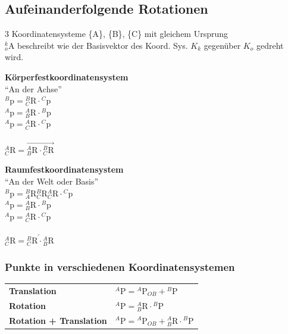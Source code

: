 \subsection{Aufeinanderfolgende Rotationen}
3 Koordinatensysteme \{A\}, \{B\}, \{C\} mit gleichem Ursprung\\
${}^k_o\mathrm{A}$ beschreibt wie der Basisvektor des Koord. Sys. $K_k$ gegenüber $K_o$ gedreht wird.\newline
\begin{minipage}{6cm}
    \textbf{Körperfestkoordinatensystem}\\
    "`An der Achse"'\\
    ${}^B\mathrm{p}={}^B_C\mathrm{R}\cdot{}^C\mathrm{p}$\\
    ${}^A\mathrm{p}={}^A_B\mathrm{R}\cdot{}^B\mathrm{p}$\\
    ${}^A\mathrm{p}={}^A_C\mathrm{R}\cdot{}^C\mathrm{p}$\\ \\
    ${}^A_C\mathrm{R}=\overrightarrow{{}^A_B\mathrm{R} \cdot {}^B_C\mathrm{R}}$\\
\end{minipage}
\begin{minipage}{6cm}
    \textbf{Raumfestkoordinatensystem}\\ 
    "`An der Welt oder Basis"'\\
    ${}^B\mathrm{p}={}^B_A\mathrm{R}{}^B_C\mathrm{R}{}^A_C\mathrm{R}\cdot{}^C\mathrm{p}$\\
    ${}^A\mathrm{p}={}^A_B\mathrm{R}\cdot{}^B\mathrm{p}$\\
    ${}^A\mathrm{p}={}^A_C\mathrm{R}\cdot{}^C\mathrm{p}$\\ \\
    ${}^A_C\mathrm{R}=\overleftarrow{{}^B_C\mathrm{R} \cdot {}^A_B\mathrm{R}}$\\
\end{minipage}   

\subsubsection{Punkte in verschiedenen Koordinatensystemen }
\begin{tabular}{ll}
    \textbf{Translation}&${}^A\mathrm{P} = {}^A\mathrm{P}_{OB}+{}^B\mathrm{P} $ \\
    \textbf{Rotation} & ${}^A\mathrm{P} = {}^A_B\mathrm{R}\cdot {}^B\mathrm{P} $\\
    \textbf{Rotation + Translation}&$ {}^A\mathrm{P} = {}^A\mathrm{P}_{OB} +{}^A_B\mathrm{R}\cdot {}^B\mathrm{P} $\\
\end{tabular}



